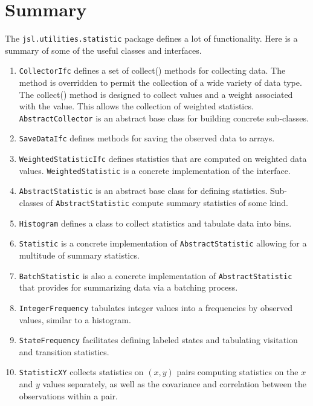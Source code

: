 \documentclass[
]{book}
\providecommand{\tightlist}{%
  \setlength{\itemsep}{0pt}\setlength{\parskip}{0pt}}
\theoremstyle{definition}
\theoremstyle{definition}
\theoremstyle{definition}
\theoremstyle{definition}
\theoremstyle{remark}
\begin{document}
\hypertarget{summary}{%
\section{Summary}\label{summary}}

The \texttt{jsl.utilities.statistic} package defines a lot of functionality. Here is a summary of some of the useful classes and interfaces.

\begin{enumerate}
\def\labelenumi{\arabic{enumi}.}
\tightlist
\item
  \texttt{CollectorIfc} defines a set of collect() methods for collecting data. The method is overridden to permit the collection of a wide variety of data type. The collect() method is designed to collect values and a weight associated with the value. This allows the collection of weighted statistics. \texttt{AbstractCollector} is an abstract base class for building concrete sub-classes.
\item
  \texttt{SaveDataIfc} defines methods for saving the observed data to arrays.
\item
  \texttt{WeightedStatisticIfc} defines statistics that are computed on weighted data values.
  \texttt{WeightedStatistic} is a concrete implementation of the interface.
\item
  \texttt{AbstractStatistic} is an abstract base class for defining statistics. Sub-classes of \texttt{AbstractStatistic} compute summary statistics of some kind.
\item
  \texttt{Histogram} defines a class to collect statistics and tabulate data into bins.
\item
  \texttt{Statistic} is a concrete implementation of \texttt{AbstractStatistic} allowing for a multitude of
  summary statistics.
\item
  \texttt{BatchStatistic} is also a concrete implementation of \texttt{AbstractStatistic} that provides for
  summarizing data via a batching process.
\item
  \texttt{IntegerFrequency} tabulates integer values into a frequencies by observed values, similar to a histogram.
\item
  \texttt{StateFrequency} facilitates defining labeled states and tabulating visitation and transition statistics.
\item
  \texttt{StatisticXY} collects statistics on \((x,y)\) pairs computing statistics on the \(x\) and \(y\) values separately, as well as the covariance and correlation between the observations within a pair.
\end{enumerate}
\end{document}
